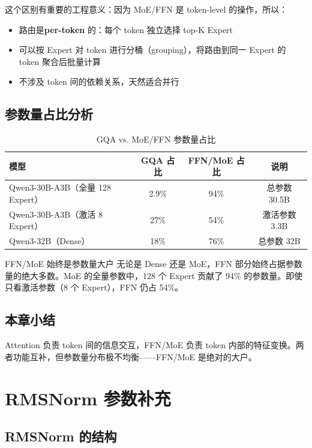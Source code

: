 \documentclass[a4paper]{article}
\begin{document}
这个区别有重要的工程意义：因为 MoE/FFN 是 token-level 的操作，所以：
\begin{itemize}
  \item 路由是\textbf{per-token} 的：每个 token 独立选择 top-K Expert
  \item 可以按 Expert 对 token 进行分桶（grouping），将路由到同一 Expert 的 token 聚合后批量计算
  \item 不涉及 token 间的依赖关系，天然适合并行
\end{itemize}

\subsection{参数量占比分析}

\begin{table}[H]
\centering
\caption{GQA vs. MoE/FFN 参数量占比}
\begin{tabular}{lccc}
\toprule
\textbf{模型} & \textbf{GQA 占比} & \textbf{FFN/MoE 占比} & \textbf{说明} \\
\midrule
Qwen3-30B-A3B（全量 128 Expert） & 2.9\% & 94\% & 总参数 30.5B \\
Qwen3-30B-A3B（激活 8 Expert） & 27\% & 54\% & 激活参数 3.3B \\
Qwen3-32B（Dense） & 18\% & 76\% & 总参数 32B \\
\bottomrule
\end{tabular}
\end{table}

\begin{knowledgebox}{FFN/MoE 始终是参数量大户}
无论是 Dense 还是 MoE，FFN 部分始终占据参数量的绝大多数。MoE 的全量参数中，128 个 Expert 贡献了 94\% 的参数量。即使只看激活参数（8 个 Expert），FFN 仍占 54\%。
\end{knowledgebox}

\subsection{本章小结}

Attention 负责 token 间的信息交互，FFN/MoE 负责 token 内部的特征变换。两者功能互补，但参数量分布极不均衡——FFN/MoE 是绝对的大户。

\section{RMSNorm 参数补充}

\subsection{RMSNorm 的结构}
\end{document}
